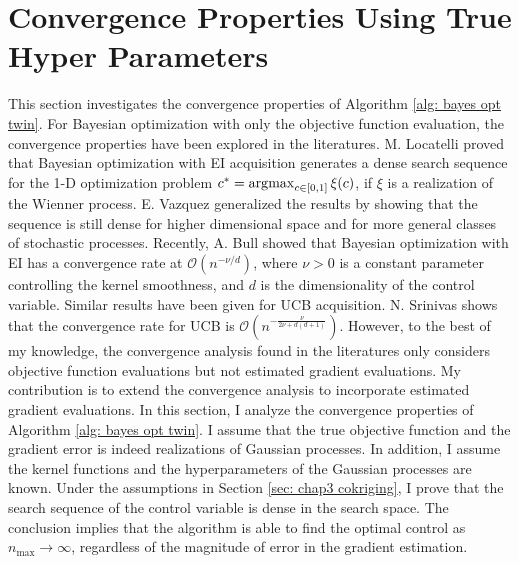 \section{Convergence Properties Using True Hyper Parameters}
\label{sec: chap3 convergence}
This section investigates the convergence properties 
of Algorithm \ref{alg: bayes opt twin}.
For Bayesian optimization with only the 
objective function evaluation, the convergence properties have been explored in the literatures.
M. Locatelli \cite{Locatelli} proved that Bayesian optimization with EI acquisition
generates a dense search sequence 
for the 1-D optimization problem 
$c^*=\operatorname*{\arg\!\max}_{c\in[0,1]} \xi(c)$, if $\xi$ is a realization of the Wienner process.
E. Vazquez \cite{convergen EI} generalized the results by showing that the sequence is still dense
for higher dimensional space and for more general classes of stochastic processes.
Recently, A. Bull \cite{converge Bull} showed that Bayesian optimization with EI
has a convergence rate at
$\mathcal{O}(n^{-\nu/d})$,
where $\nu>0$ is a constant parameter controlling the kernel smoothness, and $d$
is the dimensionality of the control variable. 
Similar results have been given for UCB acquisition. 
N. Srinivas \cite{GP bandit} shows that the convergence rate for UCB is
$\mathcal{O}(n^{- \frac{\nu}{2\nu+d(d+1)}})$.
However, to the best of my knowledge, the convergence analysis found in the literatures
only considers objective function evaluations but not estimated gradient evaluations.
My contribution is to
extend the convergence analysis to incorporate estimated gradient evaluations.
In this section, I analyze the convergence properties of Algorithm \ref{alg: bayes opt twin}.
I assume that the true objective function and the gradient error is indeed realizations of 
Gaussian processes. In addition, I assume the kernel functions and the hyperparameters
of the Gaussian processes are known.
Under the assumptions in Section \ref{sec: chap3 cokriging}, I prove that
the search sequence of the control variable is dense in the search space.
The conclusion implies that the algorithm is able to find the optimal control
as $n_{\max}\rightarrow \infty$, regardless
of the magnitude of error in the gradient estimation.\\

